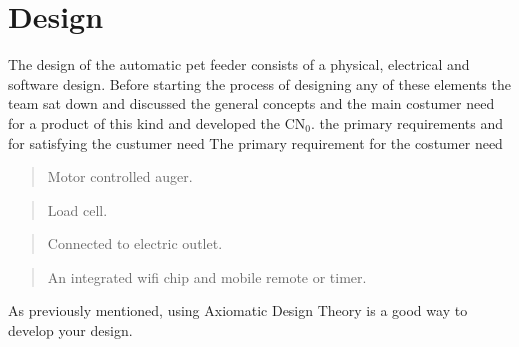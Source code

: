 \documentclass[twocolumn]{webofc}
\begin{document}
\section{Design}
The design of the automatic pet feeder consists of a physical, electrical and software design. Before starting the process of designing any of these elements the team sat down and discussed the general concepts and the main costumer need for a product of this kind and developed the CN${_0}$.  the primary requirements and  for satisfying the custumer need The primary requirement for the costumer need 



\begin{quote} \textbf{} Motor controlled auger.
\end{quote}
\begin{quote} \textbf{} Load cell.
\end{quote}
\begin{quote} \textbf{} Connected to electric outlet.
\end{quote}
\begin{quote} \textbf{} An integrated wifi chip and mobile remote or timer.
\end{quote}




As previously mentioned, using Axiomatic Design Theory is a good way to develop your design.
\end{document}
